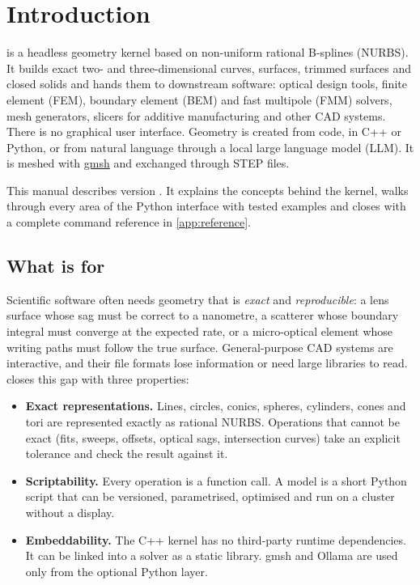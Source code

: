 \chapter{Introduction}\label{ch:intro}

\NF{} is a headless geometry kernel based on non-uniform rational B-splines (NURBS). It builds
exact two- and three-dimensional curves, surfaces, trimmed surfaces and closed solids and hands
them to downstream software: optical design tools, finite element (FEM), boundary element
(BEM) and fast multipole (FMM) solvers, mesh generators, slicers for additive manufacturing and
other CAD systems. There is no graphical user interface. Geometry is created from code, in C++
or Python, or from natural language through a local large language model (LLM). It is meshed
with \href{https://gmsh.info}{gmsh} and exchanged through STEP files.

This manual describes \NF{} version \NFVersion. It explains the concepts behind the kernel,
walks through every area of the Python interface with tested examples and closes with a
complete command reference in \cref{app:reference}.

\section{What \NF{} is for}\label{sec:intro-purpose}

Scientific software often needs geometry that is \emph{exact} and \emph{reproducible}: a lens
surface whose sag must be correct to a nanometre, a scatterer whose boundary integral must
converge at the expected rate, or a micro-optical element whose writing paths must follow the
true surface. General-purpose CAD systems are interactive, and their file formats lose
information or need large libraries to read. \NF{} closes this gap with three properties:

\begin{itemize}
  \item \textbf{Exact representations.} Lines, circles, conics, spheres, cylinders, cones and
    tori are represented exactly as rational NURBS. Operations that cannot be exact (fits,
    sweeps, offsets, optical sags, intersection curves) take an explicit tolerance and check
    the result against it.
  \item \textbf{Scriptability.} Every operation is a function call. A model is a short Python
    script that can be versioned, parametrised, optimised and run on a cluster without a
    display.
  \item \textbf{Embeddability.} The C++ kernel has no third-party runtime dependencies. It can be
    linked into a solver as a static library. gmsh and Ollama are used only from the optional
    Python layer.
\end{itemize}

